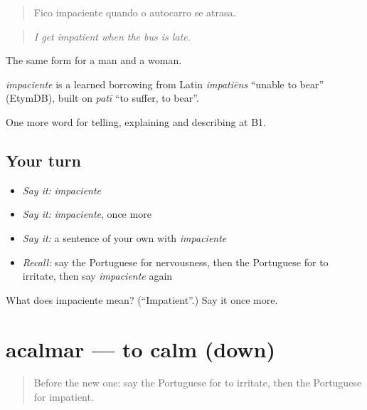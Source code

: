 \begin{quote}
Fico impaciente quando o autocarro se atrasa.
\end{quote}

\begin{quote}
\emph{I get impatient when the bus is late.}
\end{quote}

The same form for a man and a woman.

\begin{cousinweb}
\emph{impaciente} is a learned borrowing from Latin \emph{impatiēns} \textquotedblleft{}unable to bear\textquotedblright{} (EtymDB), built on \emph{patī} \textquotedblleft{}to suffer, to bear\textquotedblright{}.
\end{cousinweb}

\begin{grammarlens}[title={What you've built}]
One more word for telling, explaining and describing at B1.
\end{grammarlens}

\subsection*{Your turn}
\begin{itemize}
\raggedright
  \item \emph{Say it:} \emph{impaciente}
  \item \emph{Say it:} \emph{impaciente}, once more
  \item \emph{Say it:} a sentence of your own with \emph{impaciente}
  \item \emph{Recall:} say the Portuguese for nervousness, then the Portuguese for to irritate, then say \emph{impaciente} again
\end{itemize}

\begin{tcolorbox}[breakable,colback=teal!4,colframe=teal!35!black,title={Before you move on}]
What does impaciente mean? (\textquotedblleft{}Impatient\textquotedblright{}.) Say it once more.
\end{tcolorbox}
\section[acalmar]{acalmar — to calm (down)}

\label{lesson:PT-C475-acalmar}



\begin{quote}
Before the new one: say the Portuguese for to irritate, then the Portuguese for impatient.
\end{quote}

